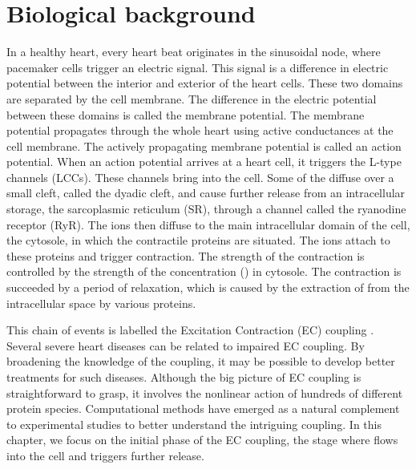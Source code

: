 \section{Biological background}
In a healthy heart, every heart beat originates in the sinusoidal node, where pacemaker cells trigger an electric signal. This signal is a difference in electric potential between the interior and exterior of the heart cells. These two domains are separated by the cell membrane. The difference in the electric potential between these domains is called the membrane potential. The membrane potential propagates through the whole heart using active conductances at the cell membrane. The actively propagating membrane potential is called an action potential. When an action potential arrives at a heart cell, it triggers the L-type \Ca channels (LCCs). These channels bring \Ca into the cell. Some of the \Ca diffuse over a small cleft, called the dyadic cleft, and cause further \Ca release from an intracellular \Ca storage, the sarcoplasmic reticulum (SR), through a channel called the ryanodine receptor (RyR). The \Ca ions then diffuse to the main intracellular domain of the cell, the cytosole, in which the contractile proteins are situated. The \Ca ions attach to these proteins and trigger contraction. The strength of the contraction is controlled by the strength of the \Ca concentration (\CaC) in cytosole. The contraction is succeeded by a period of relaxation, which is caused by the extraction of \Ca from the intracellular space by various proteins. \par

This chain of events is labelled the Excitation Contraction (EC) coupling \cite{Bers2001}. Several severe heart diseases can be related to impaired EC coupling. By broadening the knowledge of the coupling, it may be possible to develop better treatments for such diseases. Although the big picture of EC coupling is straightforward to grasp, it involves the nonlinear action of hundreds of different protein species. Computational methods have emerged as a natural complement to experimental studies to better understand the intriguing coupling. In this chapter, we focus on the initial phase of the EC coupling, the stage where \Ca flows into the cell and triggers further \Ca release.\par

